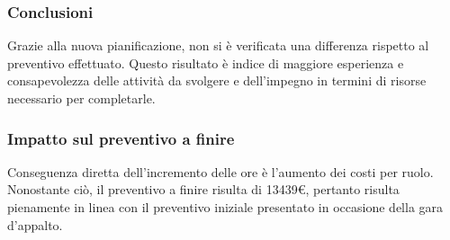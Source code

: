 \subsubsection{Conclusioni}
Grazie alla nuova pianificazione, non si è verificata una differenza rispetto al preventivo effettuato. Questo risultato è indice di maggiore esperienza e consapevolezza delle attività da svolgere e dell'impegno in termini di risorse necessario per completarle.

\subsubsection{Impatto sul preventivo a finire}
Conseguenza diretta dell'incremento delle ore è l'aumento dei costi per ruolo. Nonostante ciò, il preventivo a finire risulta di 13439€, pertanto risulta pienamente in linea con il preventivo iniziale presentato in occasione della gara d'appalto.